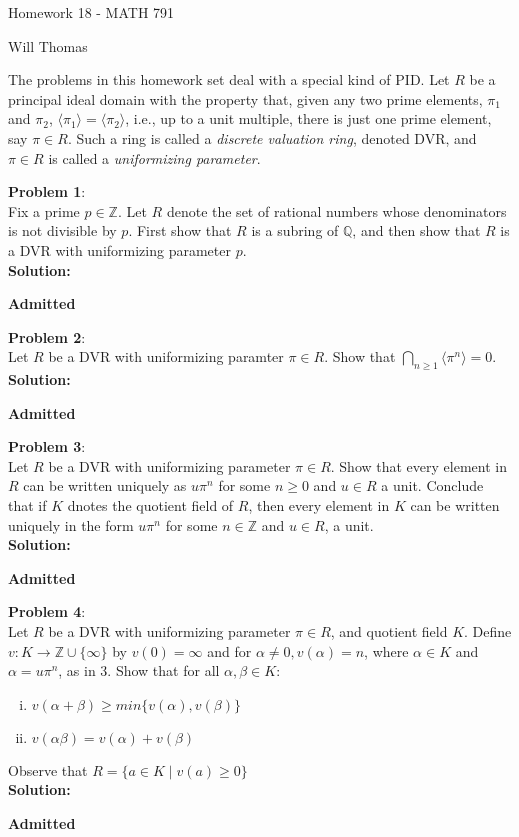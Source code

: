 \documentclass[11pt]{article}
\newcommand{\prob}[3]{\begin{flushleft}
        \textbf{Problem #1}: \\
        #2 
		\textbf{Solution:} 
		#3

\end{flushleft}}
\newcommand{\admit}{
  \begin{flushright}
    \textbf{Admitted}
  \end{flushright}
}
\newcommand{\makeHWtitle}[1]{
    \begin{center}
    \Large{Homework #1 - MATH 791} 
        \vspace{5pt}
        
        \normalsize{Will Thomas}
        \vspace{5pt}
    \end{center}
}
\begin{document}
\makeHWtitle{18}

The problems in this homework set deal with a special kind of PID.
Let $R$ be a principal ideal domain with the property that, given any two prime elements, $\pi_1$ and $\pi_2$, $\langle \pi_1 \rangle = \langle \pi_2 \rangle$, i.e., up to a unit multiple, there is just one prime element, say $\pi \in R$.
Such a ring is called a \emph{discrete valuation ring}, denoted DVR, and $\pi \in R$ is called a \emph{uniformizing parameter}.

\prob{1}{
  Fix a prime $p \in \mathbb{Z}$. Let $R$ denote the set of rational numbers whose denominators is not divisible by $p$.
  First show that $R$ is a subring of $\mathbb{Q}$, and then show that $R$ is a DVR with uniformizing parameter $p$. \\
}{ \\
  \admit
}

\prob{2}{
  Let $R$ be a DVR with uniformizing paramter $\pi \in R$. Show that $\bigcap_{n \geq 1} \langle \pi^n \rangle = 0$. \\
}{ \\
  \admit
}

\prob{3}{
  Let $R$ be a DVR with uniformizing parameter $\pi \in R$. Show that every element in $R$ can be written uniquely as $u\pi^n$ for some $n \geq 0$ and $u \in R$ a unit.
  Conclude that if $K$ dnotes the quotient field of $R$, then every element in $K$ can be written uniquely in the form $u \pi^n$ for some $n \in \mathbb{Z}$ and $u \in R$, a unit. \\
}{ \\
  \admit
}

\prob{4}{
  Let $R$ be a DVR with uniformizing parameter $\pi \in R$, and quotient field $K$. Define $v : K \rightarrow \mathbb{Z} \cup \{ \infty \}$ by $v(0) = \infty$ and for $\alpha \neq 0, v(\alpha) =n$, where $\alpha \in K$ and $\alpha = u \pi^n$, as in 3. Show that for all $\alpha, \beta \in K$:
  \begin{enumerate}[(i)]
    \item $v(\alpha + \beta) \geq min\{ v(\alpha), v(\beta) \}$
    \item $v(\alpha \beta) = v(\alpha) + v(\beta)$
  \end{enumerate}
  Observe that $R = \{ a \in K \mid v(a) \geq 0 \}$ \\
}{ \\
  \admit
}
\end{document}
